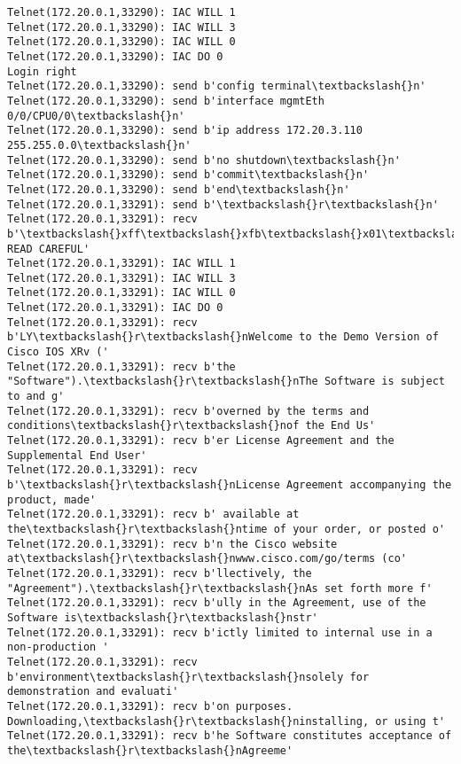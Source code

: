 \documentclass[11pt]{article}
\begin{document}
\begin{Verbatim}[commandchars=\\\{\}]
Telnet(172.20.0.1,33290): IAC WILL 1
Telnet(172.20.0.1,33290): IAC WILL 3
Telnet(172.20.0.1,33290): IAC WILL 0
Telnet(172.20.0.1,33290): IAC DO 0
Login right
Telnet(172.20.0.1,33290): send b'config terminal\textbackslash{}n'
Telnet(172.20.0.1,33290): send b'interface mgmtEth 0/0/CPU0/0\textbackslash{}n'
Telnet(172.20.0.1,33290): send b'ip address 172.20.3.110 255.255.0.0\textbackslash{}n'
Telnet(172.20.0.1,33290): send b'no shutdown\textbackslash{}n'
Telnet(172.20.0.1,33290): send b'commit\textbackslash{}n'
Telnet(172.20.0.1,33290): send b'end\textbackslash{}n'
Telnet(172.20.0.1,33291): send b'\textbackslash{}r\textbackslash{}n'
Telnet(172.20.0.1,33291): recv b'\textbackslash{}xff\textbackslash{}xfb\textbackslash{}x01\textbackslash{}xff\textbackslash{}xfb\textbackslash{}x03\textbackslash{}xff\textbackslash{}xfb\textbackslash{}x00\textbackslash{}xff\textbackslash{}xfd\textbackslash{}x00\textbackslash{}x1b]0;xrv11\textbackslash{}x07\textbackslash{}r\textbackslash{}n\textbackslash{}r\textbackslash{}nIMPORTANT:  READ CAREFUL'
Telnet(172.20.0.1,33291): IAC WILL 1
Telnet(172.20.0.1,33291): IAC WILL 3
Telnet(172.20.0.1,33291): IAC WILL 0
Telnet(172.20.0.1,33291): IAC DO 0
Telnet(172.20.0.1,33291): recv b'LY\textbackslash{}r\textbackslash{}nWelcome to the Demo Version of Cisco IOS XRv ('
Telnet(172.20.0.1,33291): recv b'the "Software").\textbackslash{}r\textbackslash{}nThe Software is subject to and g'
Telnet(172.20.0.1,33291): recv b'overned by the terms and conditions\textbackslash{}r\textbackslash{}nof the End Us'
Telnet(172.20.0.1,33291): recv b'er License Agreement and the Supplemental End User'
Telnet(172.20.0.1,33291): recv b'\textbackslash{}r\textbackslash{}nLicense Agreement accompanying the product, made'
Telnet(172.20.0.1,33291): recv b' available at the\textbackslash{}r\textbackslash{}ntime of your order, or posted o'
Telnet(172.20.0.1,33291): recv b'n the Cisco website at\textbackslash{}r\textbackslash{}nwww.cisco.com/go/terms (co'
Telnet(172.20.0.1,33291): recv b'llectively, the "Agreement").\textbackslash{}r\textbackslash{}nAs set forth more f'
Telnet(172.20.0.1,33291): recv b'ully in the Agreement, use of the Software is\textbackslash{}r\textbackslash{}nstr'
Telnet(172.20.0.1,33291): recv b'ictly limited to internal use in a non-production '
Telnet(172.20.0.1,33291): recv b'environment\textbackslash{}r\textbackslash{}nsolely for demonstration and evaluati'
Telnet(172.20.0.1,33291): recv b'on purposes.  Downloading,\textbackslash{}r\textbackslash{}ninstalling, or using t'
Telnet(172.20.0.1,33291): recv b'he Software constitutes acceptance of the\textbackslash{}r\textbackslash{}nAgreeme'

\end{Verbatim}
\end{document}
